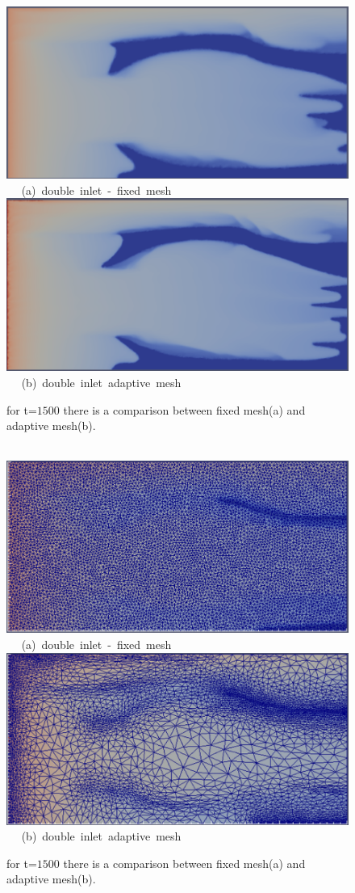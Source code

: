 \documentclass[preprint,authoryear,12pt]{elsarticle}
\begin{document}
\begin{figure}[h]
\vbox{
\hbox{\hspace{3.5cm}
\includegraphics[width=.5\textwidth]{./Pics1/5reg_dinlet_fixed_1500.pdf} 
}
\vspace{0.0cm}
\hbox{\hspace{5.0cm} (a) double inlet - fixed mesh   
}
\hbox{\hspace{3.5cm}
\includegraphics[width=.5\textwidth]{./Pics1/5reg_dinlet_adapt_1500.pdf}
}
\vspace{0.0cm}
\hbox{\hspace{5.0cm} (b) double inlet adaptive mesh   
}
}     
\caption{for t=$1500$ there is a comparison between fixed mesh(a) and adaptive mesh(b).}
\label{fig:3testcase_c}
\end{figure}

\begin{figure}[h]
\vbox{
\hbox{\hspace{3.5cm}
\includegraphics[width=.5\textwidth]{./Pics1/5reg_dinlet_fixed_end.pdf} 
}
\vspace{0.0cm}
\hbox{\hspace{5.0cm} (a) double inlet - fixed mesh   
}
\hbox{\hspace{3.5cm}
\includegraphics[width=.5\textwidth]{./Pics1/5reg_dinlet_adapt_end.pdf}
}
\vspace{0.0cm}
\hbox{\hspace{5.0cm} (b) double inlet adaptive mesh   
}
}     
\caption{for t=$1500$ there is a comparison between fixed mesh(a) and adaptive mesh(b).}
\label{fig:3testcase_d}
\end{figure}
\end{document}
